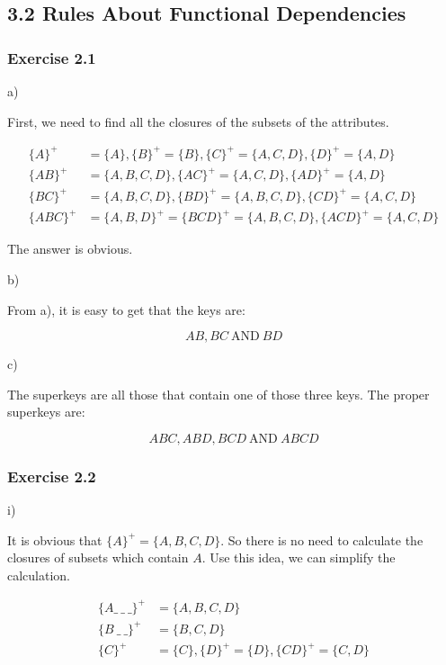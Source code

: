 \documentclass[../../main.tex]{subfiles}
\begin{document}
\subsection*{3.2 Rules About Functional Dependencies}

\subsubsection*{Exercise 2.1}

a)

First, we need to find all the closures of the subsets
of the attributes.

\begin{align*}
  \{A\}^{+} &= \{A\},   \{B\}^{+} = \{B\},
  \{C\}^{+} = \{A, C, D\}, \{D\}^{+}= \{A,D\} \\
  \{AB\}^{+} &= \{A,B,C,D\},  \{AC\}^{+} = \{A,C,D\},
  \{AD\}^{+} = \{A,D\} \\
  \{BC\}^{+} &= \{A,B,C,D\}, \{BD\}^{+} = \{A,B,C,D\},
  \{CD\}^{+} = \{A,C,D\} \\
  \{ABC\}^{+} &= \{A,B,D\}^{+} = \{BCD\}^{+} = \{A,B,C,D\},
  \{ACD\}^{+} = \{A,C,D\}
\end{align*}

The answer is obvious.

b)

From a), it is easy to get that the keys are:

$$
AB, BC \ \mbox{AND} \ BD
$$

c)

The superkeys are all those that contain one of those three
keys. The proper superkeys are:

$$
ABC, ABD, BCD \ \mbox{AND} \ ABCD
$$

\subsubsection*{Exercise 2.2}

i)

It is obvious that $\{A\}^{+} = \{A,B,C,D\}$. So there is no
need to calculate the closures of subsets which contain $A$.
Use this idea, we can simplify the calculation.

\begin{align*}
  \{A \_ \ \_ \ \_ \}^{+} &= \{A,B,C,D\} \\
  \{B \ \_ \ \_ \}^{+} &= \{B,C,D\} \\
  \{C\}^{+} &= \{C\}, \{D\}^{+} = \{D\}, \{CD\}^{+} = \{C,D\}
\end{align*}
\end{document}
